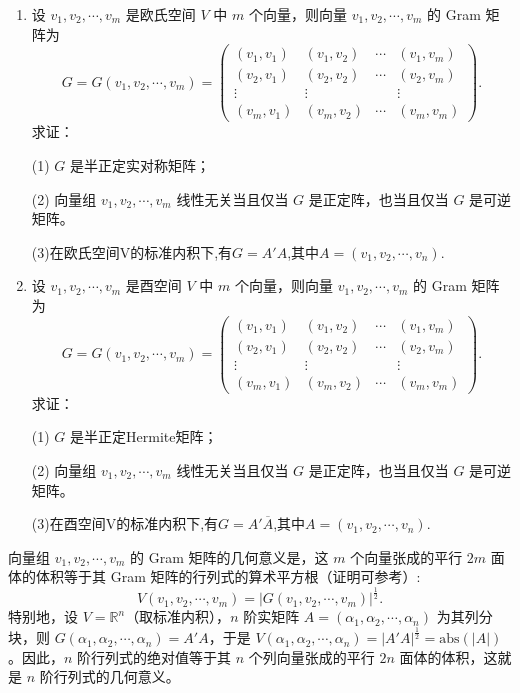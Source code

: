 \documentclass[../../main.tex]{subfiles}%
\begin{document}
\begin{theorem}[Gram阵的性质]\label{theorem:欧氏空间中Gram阵的性质-例9.5}
\begin{enumerate}
\item 设 $v_1,v_2,\cdots,v_m$ 是欧氏空间 $V$ 中 $m$ 个向量，则向量 $v_1,v_2,\cdots,v_m$ 的 Gram 矩阵为
\[
G = G(v_1,v_2,\cdots,v_m)=\begin{pmatrix}
(v_1,v_1) & (v_1,v_2) & \cdots & (v_1,v_m)\\
(v_2,v_1) & (v_2,v_2) & \cdots & (v_2,v_m)\\
\vdots & \vdots & & \vdots\\
(v_m,v_1) & (v_m,v_2) & \cdots & (v_m,v_m)
\end{pmatrix}.
\]
求证：

(1) $G$ 是半正定实对称矩阵；

(2) 向量组 $v_1,v_2,\cdots,v_m$ 线性无关当且仅当 $G$ 是正定阵，也当且仅当 $G$ 是可逆矩阵。

(3)在欧氏空间V的标准内积下,有$G=A'A$,其中$A=(v_1,v_2,\cdots,v_n)$.

\item 设 $v_1,v_2,\cdots,v_m$ 是酉空间 $V$ 中 $m$ 个向量，则向量 $v_1,v_2,\cdots,v_m$ 的 Gram 矩阵为
\[
G = G(v_1,v_2,\cdots,v_m)=\begin{pmatrix}
(v_1,v_1) & (v_1,v_2) & \cdots & (v_1,v_m)\\
(v_2,v_1) & (v_2,v_2) & \cdots & (v_2,v_m)\\
\vdots & \vdots & & \vdots\\
(v_m,v_1) & (v_m,v_2) & \cdots & (v_m,v_m)
\end{pmatrix}.
\]
求证：

(1) $G$ 是半正定Hermite矩阵；

(2) 向量组 $v_1,v_2,\cdots,v_m$ 线性无关当且仅当 $G$ 是正定阵，也当且仅当 $G$ 是可逆矩阵。

(3)在酉空间V的标准内积下,有$G=A'\overline{A}$,其中$A=(v_1,v_2,\cdots,v_n)$.
\end{enumerate}
\end{theorem}
\begin{remark}
向量组 $v_1,v_2,\cdots,v_m$ 的 Gram 矩阵的几何意义是，这 $m$ 个向量张成的平行 $2m$ 面体的体积等于其 Gram 矩阵的行列式的算术平方根（证明可参考）:
\[
V(v_1,v_2,\cdots,v_m)=|G(v_1,v_2,\cdots,v_m)|^{\frac{1}{2}}.
\]
特别地，设 $V = \mathbb{R}^n$（取标准内积），$n$ 阶实矩阵 $A = (\alpha_1,\alpha_2,\cdots,\alpha_n)$ 为其列分块，则 $G(\alpha_1,\alpha_2,\cdots,\alpha_n)=A'A$，于是 $V(\alpha_1,\alpha_2,\cdots,\alpha_n)=|A'A|^{\frac{1}{2}}=\text{abs}(|A|)$。因此，$n$ 阶行列式的绝对值等于其 $n$ 个列向量张成的平行 $2n$ 面体的体积，这就是 $n$ 阶行列式的几何意义。 
\end{remark}
\end{document}
